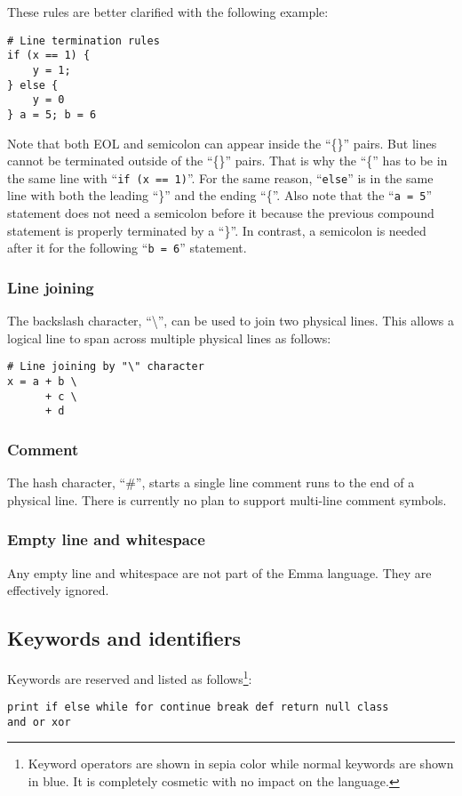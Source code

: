 \documentclass[10pt,a4paper]{article}
\begin{document}
These rules are better clarified with the following example:

\begin{lstlisting}
# Line termination rules
if (x == 1) {
    y = 1;
} else {
    y = 0
} a = 5; b = 6
\end{lstlisting}

Note that both EOL and semicolon can appear inside the ``\{\}'' pairs. 
But lines cannot be terminated outside of the ``\{\}'' pairs. That is
why the ``\{'' has to be in the same line with ``\lstinline$if (x == 1)$''.
For the same reason, ``\lstinline$else$'' is in the same line with both 
the leading
``\}'' and the ending ``\{''. Also note that the ``\lstinline$a = 5$'' 
statement does
not need a semicolon before it because the previous compound statement
is properly terminated by a ``\}''. In contrast, a semicolon is needed
after it for the following ``\lstinline$b = 6$'' statement.

\subsubsection{Line joining}
The backslash character, ``\textbackslash'', can be used to join two 
physical lines.
This allows a logical line to span across multiple physical lines as follows:
\begin{lstlisting}
# Line joining by "\" character
x = a + b \
      + c \
      + d
\end{lstlisting}

\subsubsection{Comment}
The hash character, ``\#'', starts a single line comment runs to the end
of a physical line. There is currently no plan to support multi-line
comment symbols.

\subsubsection{Empty line and whitespace}
Any empty line and whitespace are not part of the Emma language. They are
effectively ignored.

\subsection{Keywords and identifiers}
Keywords are reserved and listed as follows\footnote{Keyword operators 
are shown in sepia color while normal keywords are shown in blue. It is 
completely cosmetic with no impact on the language.}:
\begin{lstlisting}
print if else while for continue break def return null class 
and or xor 
\end{lstlisting}
\end{document}

